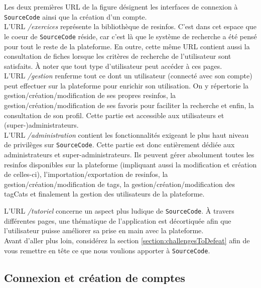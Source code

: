 Les deux premières URL de la figure désignent les interfaces de connexion à \texttt{SourceCode} ainsi que la création d'un compte.\\

L'URL \textit{/exercices} représente la bibliothèque de \glspl{resinfo}. C'est dans cet espace que le coeur de \texttt{SourceCode} réside, car c'est là que le système de recherche a été pensé pour tout le reste de la plateforme. En outre,
cette même URL contient aussi la consultation de \glspl{fiche} lorsque les critères de recherche de l'utilisateur sont satisfaits. À noter que tout type d'utilisateur peut accéder à ces pages.\\

L'URL \textit{/gestion} renferme tout ce dont un utilisateur (connecté avec son compte) peut effectuer sur la plateforme pour enrichir son utilisation. On y répertorie la gestion/création/modification de ses propres \glspl{resinfo}, la gestion/création/modification de ses favoris pour faciliter la recherche et enfin, la consultation de son profil. Cette partie est accessible aux utilisateurs et (super-)administrateurs.\\

L'URL \textit{/administration} contient les fonctionnalités exigeant le plus haut niveau de privilèges sur \texttt{SourceCode}. Cette partie est donc entièrement dédiée aux administrateurs et super-administrateurs. Ils peuvent gérer absolument toutes les \glspl{resinfo} disponibles sur la plateforme (impliquant aussi la modification et création de celles-ci), l'importation/exportation de \glspl{resinfo}, la gestion/création/modification de \glspl{tag}, la gestion/création/modification des \glspl{tagCat} et finalement la gestion des utilisateurs de la plateforme.\\

\pagebreak

L'URL \textit{/tutoriel} concerne un aspect plus ludique de \texttt{SourceCode}. À travers différentes pages, une thématique de l'application est décortiquée afin que l'utilisateur puisse améliorer sa prise en main avec la plateforme.\\

Avant d'aller plus loin, considérez la section \ref{section:challengesToDefeat} afin de vous remettre en tête ce que nous voulions apporter à \texttt{SourceCode}.

\subsection{Connexion et création de comptes}

